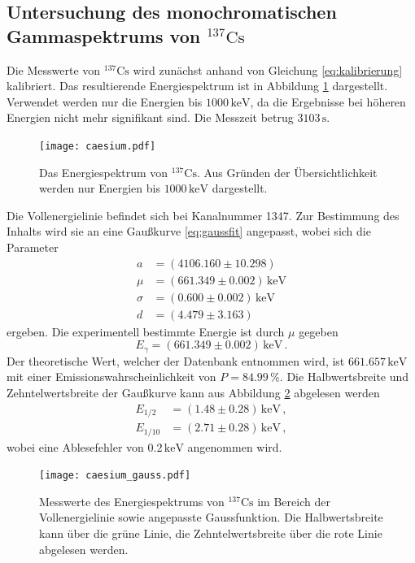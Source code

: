 \subsection{Untersuchung des monochromatischen Gammaspektrums von \texorpdfstring{$^{137}\text{Cs}$}{Cs}}
Die Messwerte von $^{137}\text{Cs}$ wird zunächst anhand von Gleichung \eqref{eq:kalibrierung}
kalibriert. Das resultierende Energiespektrum ist in Abbildung \ref{fig:energie-caesium} dargestellt.
Verwendet werden nur die Energien bis $1000 \, \text{keV}$, da die Ergebnisse bei höheren Energien nicht mehr
signifikant sind. Die Messzeit betrug $3103 \, \text{s}$.
\FloatBarrier
\begin{figure}
\centering
\texttt{[image: caesium.pdf]}
\caption{Das Energiespektrum von $^{137}\text{Cs}$. 
        Aus Gründen der Übersichtlichkeit werden nur Energien bis $1000 \, \text{keV}$ dargestellt.}
\label{fig:energie-caesium}
\end{figure}
\FloatBarrier
Die Vollenergielinie befindet sich bei Kanalnummer 1347. Zur Bestimmung des Inhalts 
wird sie an eine Gaußkurve \eqref{eq:gaussfit} angepasst, wobei sich die Parameter
\begin{align}
    a &= (4106.160 ± 10.298) \, \\
    \mu &= (661.349 ± 0.002) \, \text{keV} \\
    \sigma &= (0.600 ± 0.002) \, \text{keV} \\
    d &= (4.479 ± 3.163) \,
\end{align}
ergeben.
Die experimentell bestimmte Energie ist durch $\mu$ gegeben
\begin{equation}
    E_\gamma = (661.349 ± 0.002) \, \text{keV} \, .
\end{equation}
Der theoretische Wert, welcher der Datenbank \cite{Datenbank} entnommen wird, ist $661.657 \, \text{keV}$
mit einer Emissionswahrscheinlichkeit von $P = 84.99 \, \%$.
Die Halbwertsbreite und Zehntelwertsbreite der Gaußkurve kann aus Abbildung \ref{fig:caesium-gauss}
abgelesen werden
\begin{align*}
    E_{1/2}  &= (1.48 \pm 0.28) \, \text{keV} \, , \\
    E_{1/10} &= (2.71 \pm 0.28) \, \text{keV} \, ,
\end{align*}
wobei eine Ablesefehler von $0.2 \, \text{keV}$ angenommen wird.
\begin{figure}
\centering
\texttt{[image: caesium\_gauss.pdf]}
\caption{Messwerte des Energiespektrums von $^{137}\text{Cs}$ im Bereich der Vollenergielinie sowie angepasste Gaussfunktion.
    Die Halbwertsbreite kann über die grüne Linie, die Zehntelwertsbreite über die rote Linie abgelesen werden.}
\label{fig:caesium-gauss}
\end{figure}
